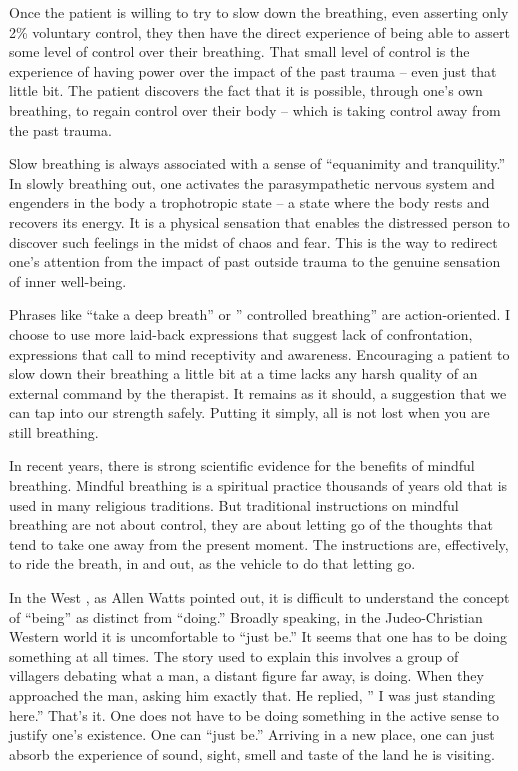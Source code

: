 \documentclass[]{book}
\begin{document}
Once the patient is willing to try to slow down the breathing, even asserting only 2\% voluntary control, they then have the direct experience of being able to assert some level of control over their breathing. That small level of control is the experience of having power over the impact of the past trauma -- even just that little bit. The patient discovers the fact that it is possible, through one's own breathing, to regain control over their body -- which is taking control away from the past trauma.

Slow breathing is always associated with a sense of ``equanimity and tranquility.'' In slowly breathing out, one activates the parasympathetic nervous system and engenders in the body a trophotropic state -- a state where the body rests and recovers its energy. It is a physical sensation that enables the distressed person to discover such feelings in the midst of chaos and fear. This is the way to redirect one's attention from the impact of past outside trauma to the genuine sensation of inner well-being.

Phrases like ``take a deep breath'' or '' controlled breathing'' are action-oriented. I choose to use more laid-back expressions that suggest lack of confrontation, expressions that call to mind receptivity and awareness. Encouraging a patient to slow down their breathing a little bit at a time lacks any harsh quality of an external command by the therapist. It remains as it should, a suggestion that we can tap into our strength safely. Putting it simply, all is not lost when you are still breathing.

In recent years, there is strong scientific evidence for the benefits of mindful breathing. Mindful breathing is a spiritual practice thousands of years old that is used in many religious traditions. But traditional instructions on mindful breathing are not about control, they are about letting go of the thoughts that tend to take one away from the present moment. The instructions are, effectively, to ride the breath, in and out, as the vehicle to do that letting go.

In the West , as Allen Watts pointed out, it is difficult to understand the concept of ``being'' as distinct from ``doing.'' Broadly speaking, in the Judeo-Christian Western world it is uncomfortable to ``just be.'' It seems that one has to be doing something at all times. The story used to explain this involves a group of villagers debating what a man, a distant figure far away, is doing. When they approached the man, asking him exactly that. He replied, '' I was just standing here.'' That's it. One does not have to be doing something in the active sense to justify one's existence. One can ``just be.'' Arriving in a new place, one can just absorb the experience of sound, sight, smell and taste of the land he is visiting.
\end{document}
